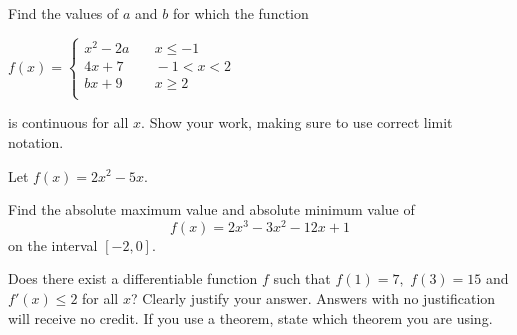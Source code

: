 \documentclass[addpoints,12pt]{exam}
\begin{document}
\begin{questions}

\newpage

\question[5] Find the values of $a$ and $b$ for which the function


$ f(x) = \left\{
       \begin{array}{ll}
          x^2 -2a & \quad x \le -1 \\
         4x+7 & \quad -1<x<2 \\
         bx+9 & \quad x \ge 2 \\
       \end{array}
   \right. $

is continuous for all $x.$ Show your work, making sure to use correct limit notation.

\newpage


\question Let $f(x) = 2x^2-5x$.


\newpage


\question[5] Find the absolute maximum value and absolute minimum value of $$f(x)
=2x^3-3x^2-12x+1 $$ on the interval $[-2 , 0].$

\newpage

\question[4] Does there exist a differentiable function $f$ such that $f(1) = 7,$ $ f(3) = 15$ and
$f'(x) \le 2$ for all $x$? Clearly justify your answer. Answers with no justification will receive no
credit. If you use a theorem, state which theorem
you are using.


\end{questions}
\end{document}
